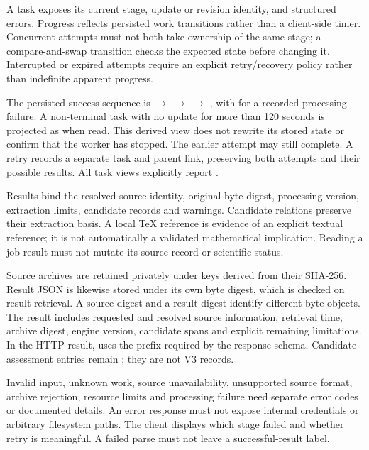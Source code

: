  A task exposes its current stage, update or revision identity, and structured errors. Progress reflects persisted work transitions rather than a client-side timer. Concurrent attempts must not both take ownership of the same stage; a compare-and-swap transition checks the expected state before changing it. Interrupted or expired attempts require an explicit retry/recovery policy rather than indefinite apparent progress.

The persisted success sequence is  $\to$  $\to$  $\to$ , with  for a recorded processing failure. A non-terminal task with no update for more than 120 seconds is projected as  when read. This derived view does not rewrite its stored state or confirm that the worker has stopped. The earlier attempt may still complete. A retry records a separate task and parent link, preserving both attempts and their possible results. All task views explicitly report .

 Results bind the resolved source identity, original byte digest, processing version, extraction limits, candidate records and warnings. Candidate relations preserve their extraction basis. A local TeX reference is evidence of an explicit textual reference; it is not automatically a validated mathematical implication. Reading a job result must not mutate its source record or scientific status.

Source archives are retained privately under keys derived from their SHA-256. Result JSON is likewise stored under its own byte digest, which is checked on result retrieval. A source digest and a result digest identify different byte objects. The result includes requested and resolved source information, retrieval time, archive digest, engine version, candidate spans and explicit remaining limitations. In the HTTP result,  uses the  prefix required by the response schema. Candidate assessment entries remain ; they are not V3  records.

 Invalid input, unknown work, source unavailability, unsupported source format, archive rejection, resource limits and processing failure need separate error codes or documented details. An error response must not expose internal credentials or arbitrary filesystem paths. The client displays which stage failed and whether retry is meaningful. A failed parse must not leave a successful-result label.

